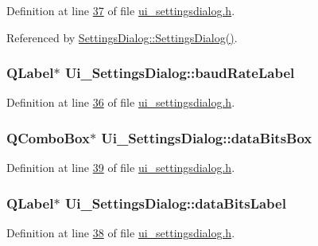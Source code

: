 Definition at line \hyperlink{a00141_source_l00037}{37} of file \hyperlink{a00141_source}{ui\+\_\+settingsdialog.\+h}.



Referenced by \hyperlink{a00131_source_l00052}{Settings\+Dialog\+::\+Settings\+Dialog()}.

\hypertarget{a00082_a57e59712bae4f482b1ff1d61c81471e8}{
\subsubsection[{baud\+Rate\+Label}]{\setlength{\rightskip}{0pt plus 5cm}Q\+Label$\ast$ Ui\+\_\+\+Settings\+Dialog\+::baud\+Rate\+Label}}\label{a00082_a57e59712bae4f482b1ff1d61c81471e8}


Definition at line \hyperlink{a00141_source_l00036}{36} of file \hyperlink{a00141_source}{ui\+\_\+settingsdialog.\+h}.

\hypertarget{a00082_ab6082bb196e22af4ca04a04db3402166}{
\subsubsection[{data\+Bits\+Box}]{\setlength{\rightskip}{0pt plus 5cm}Q\+Combo\+Box$\ast$ Ui\+\_\+\+Settings\+Dialog\+::data\+Bits\+Box}}\label{a00082_ab6082bb196e22af4ca04a04db3402166}


Definition at line \hyperlink{a00141_source_l00039}{39} of file \hyperlink{a00141_source}{ui\+\_\+settingsdialog.\+h}.

\hypertarget{a00082_a4d827d5f217aa166e228b0e2c9c5aaf7}{
\subsubsection[{data\+Bits\+Label}]{\setlength{\rightskip}{0pt plus 5cm}Q\+Label$\ast$ Ui\+\_\+\+Settings\+Dialog\+::data\+Bits\+Label}}\label{a00082_a4d827d5f217aa166e228b0e2c9c5aaf7}


Definition at line \hyperlink{a00141_source_l00038}{38} of file \hyperlink{a00141_source}{ui\+\_\+settingsdialog.\+h}.

